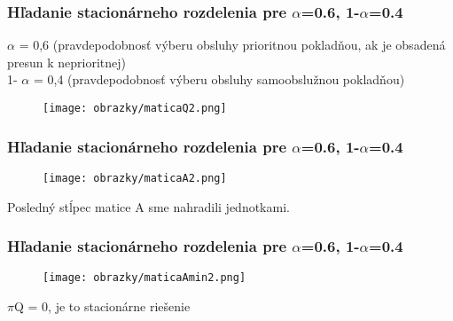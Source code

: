 \documentclass[hyperref={pdfpagelabels=false}]{beamer}
\begin{document}
\begin{frame}
\frametitle{Hľadanie stacionárneho rozdelenia pre $\alpha$=0.6, 1-$\alpha$=0.4}
$\alpha$ = 0,6 (pravdepodobnosť výberu obsluhy prioritnou pokladňou, ak je obsadená presun k neprioritnej)\\
1- $\alpha$ = 0,4 (pravdepodobnosť výberu obsluhy samoobslužnou pokladňou)
\begin{figure}[!hlrbt]
\begin{center}
\texttt{[image: obrazky/maticaQ2.png]}
\end{center}
\end{figure}
\end{frame}

\begin{frame}
\frametitle{Hľadanie stacionárneho rozdelenia pre $\alpha$=0.6, 1-$\alpha$=0.4}
\begin{figure}[!hlrbt]
\begin{center}
\texttt{[image: obrazky/maticaA2.png]}
\end{center}
\end{figure}
Posledný stĺpec matice A sme nahradili jednotkami.
\end{frame}

\begin{frame}
\frametitle{Hľadanie stacionárneho rozdelenia pre $\alpha$=0.6, 1-$\alpha$=0.4}
\begin{figure}[!hlrbt]
\begin{center}
\texttt{[image: obrazky/maticaAmin2.png]}
\end{center}
\end{figure}
$\pi$Q = 0, je to stacionárne riešenie
\end{frame}
\end{document}
